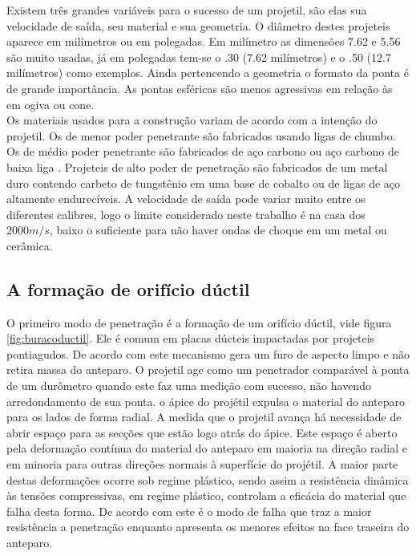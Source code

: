 Existem três grandes variáveis para o sucesso de um projetil, são elas sua velocidade de saída, seu material e sua geometria. O diâmetro destes projeteis aparece em milímetros ou em polegadas. Em milímetro as dimensões 7.62 e 5.56 são muito usadas, já em polegadas tem-se o .30 (7.62 milímetros)  e o .50 (12.7 milímetros) como exemplos. Ainda pertencendo a geometria o formato da ponta é de grande importância. As pontas esféricas são menos agressivas em relação às em ogiva ou cone.\\
Os materiais usados para a construção variam de acordo com a intenção do projetil. Os de menor poder penetrante são fabricados usando ligas de chumbo. Os de médio poder penetrante são fabricados de aço carbono ou aço carbono de baixa liga . Projeteis de alto poder de penetração são fabricados de um metal duro contendo carbeto de tungstênio em uma base de cobalto ou de ligas de aço altamente endurecíveis. A velocidade de saída pode variar muito entre os diferentes calibres, logo o limite considerado neste trabalho é na casa dos $ 2000 m/s $, baixo o suficiente para não haver ondas de choque em um metal ou cerâmica. \\


\subsection{A formação de orifício dúctil}
 O primeiro modo de penetração é a formação de um orifício dúctil, vide figura \ref{fig:buracoductil}. Ele é comum em placas dúcteis impactadas por projeteis pontiagudos. De acordo com \cite{Crouch} este mecanismo gera um furo de aspecto limpo e não retira massa do anteparo. O projetil age como um penetrador comparável à ponta de um durômetro quando este faz uma medição com sucesso, não havendo arredondamento de sua ponta. o ápice do projétil expulsa o material do anteparo para os lados de forma radial. A medida que o projetil avança há necessidade de abrir espaço para as secções que estão logo atrás do ápice. Este espaço é aberto pela deformação contínua do material do anteparo em maioria na direção radial e em minoria para outras direções normais à superfície do projétil. A maior parte destas deformações ocorre sob regime plástico, sendo assim a resistência dinâmica às tensões compressivas, em regime plástico, controlam a eficácia do material que falha desta forma. De acordo com \cite{Crouch} este é o modo de falha que traz a maior resistência a penetração enquanto apresenta os menores efeitos na face traseira do anteparo.
 
